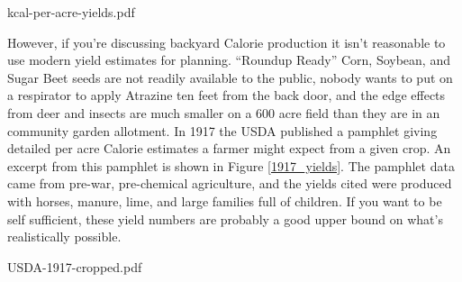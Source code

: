 \documentclass[onecolumn]{article}
\begin{document}
kcal-per-acre-yields.pdf

However, if you're discussing backyard Calorie production it isn't reasonable to use modern yield estimates for planning.  ``Roundup Ready'' Corn, Soybean, and Sugar Beet seeds are not readily available to the public, nobody wants to put on a respirator to apply Atrazine ten feet from the back door,  and the edge effects from deer and insects are much smaller on a $600$ acre field than they are in an community garden allotment.  In 1917 the USDA published a pamphlet \cite{USDA_1917_yields_pamphlet} giving detailed per acre Calorie estimates a farmer might expect from a given crop.  An excerpt from this pamphlet is shown in Figure \ref{1917_yields}.  
The pamphlet data came from pre-war, pre-chemical agriculture, and the yields cited were produced with horses, manure, lime, and large families full of children.  If you want to be self sufficient, these yield numbers are probably a good upper bound on what's realistically possible.  

USDA-1917-cropped.pdf
\end{document}
